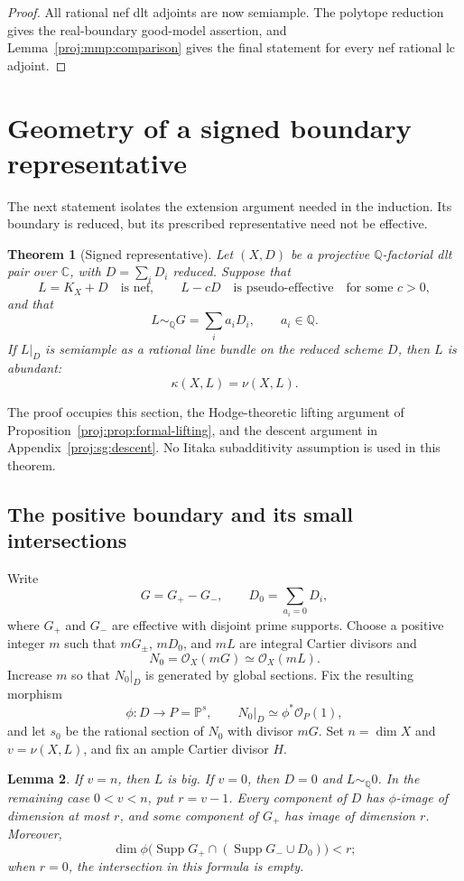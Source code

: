 \documentclass[11pt,letterpaper]{article}
\newtheorem{theorem}{Theorem}[section]
\newtheorem{lemma}[theorem]{Lemma}
\theoremstyle{definition}
\theoremstyle{remark}
\begin{document}
\begin{proof}
All rational nef dlt adjoints are now semiample.
The polytope reduction gives the real-boundary good-model
assertion, and Lemma~\ref{proj:mmp:comparison} gives the final
statement for every nef rational lc adjoint.
\end{proof}

\section{Geometry of a signed boundary representative}
\label{proj:sg:section}

The next statement isolates the extension argument needed in the
induction.  Its boundary is reduced, but its prescribed representative
need not be effective.

\begin{theorem}[Signed representative]\label{proj:thm:signed}
Let $(X,D)$ be a projective $\mathbb{Q}$-factorial dlt pair over $\mathbb{C}$, with
$D=\sum_iD_i$ reduced.  Suppose that
\[
 L=K_X+D\quad\text{is nef},\qquad L-cD\quad\text{is pseudo-effective}
 \quad\text{for some }c>0,
\]
and that
\[
 L\sim_{\mathbb{Q}}G=\sum_i a_iD_i,\qquad a_i\in\mathbb{Q}.
\]
If $L|_D$ is semiample as a rational line bundle on the reduced scheme
$D$, then $L$ is abundant:
\[
 \kappa(X,L)=\nu(X,L).
\]
\end{theorem}

The proof occupies this section, the Hodge-theoretic lifting argument
of Proposition~\ref{proj:prop:formal-lifting}, and the descent argument in
Appendix~\ref{proj:sg:descent}.  No Iitaka subadditivity assumption is used
in this theorem.

\subsection{The positive boundary and its small intersections}

Write
\[
 G=G_+-G_-,\qquad D_0=\sum_{a_i=0}D_i,
\]
where $G_+$ and $G_-$ are effective with disjoint prime supports.
Choose a positive integer $m$ such that $mG_\pm$, $mD_0$, and $mL$
are integral Cartier divisors and
\[
 N_0=\mathcal{O}_X(mG)\simeq\mathcal{O}_X(mL).
\]
Increase $m$ so that $N_0|_D$ is generated by global sections.  Fix the
resulting morphism
\[
 \phi:D\longrightarrow P=\mathbb{P}^s,\qquad
 N_0|_D\simeq\phi^*\mathcal{O}_P(1),
\]
and let $s_0$ be the rational section of $N_0$ with divisor $mG$.
Set $n=\dim X$ and $v=\nu(X,L)$, and fix an ample Cartier divisor $H$.

\begin{lemma}\label{proj:sg:numerical-boundary}
If $v=n$, then $L$ is big.  If $v=0$, then $D=0$ and
$L\sim_{\mathbb{Q}}0$.  In the remaining case $0<v<n$, put $r=v-1$.
Every component of $D$ has $\phi$-image of dimension at most $r$,
and some component of $G_+$ has image of dimension $r$.
Moreover,
\[
 \dim\phi\bigl(\operatorname{Supp} G_+\cap(\operatorname{Supp} G_-\cup D_0)\bigr)<r;
\]
when $r=0$, the intersection in this formula is empty.
\end{lemma}
\end{document}
